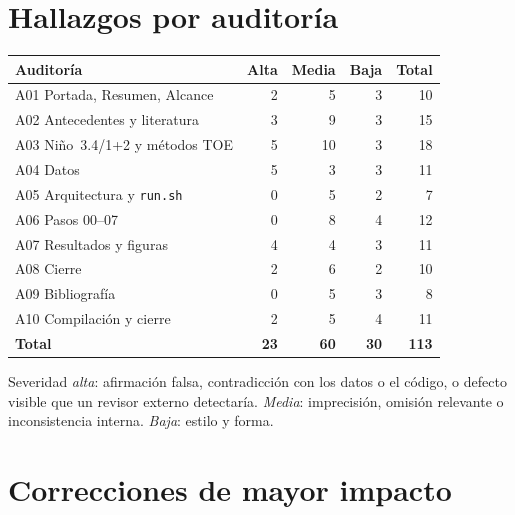 \section{Hallazgos por auditoría}

\begin{center}\small
\begin{tabular}{@{}lrrrr@{}}
\toprule
Auditoría & Alta & Media & Baja & Total \\
\midrule
A01 Portada, Resumen, Alcance & 2 & 5 & 3 & 10 \\
A02 Antecedentes y literatura & 3 & 9 & 3 & 15 \\
A03 Niño~3.4/1+2 y métodos TOE & 5 & 10 & 3 & 18 \\
A04 Datos & 5 & 3 & 3 & 11 \\
A05 Arquitectura y \texttt{run.sh} & 0 & 5 & 2 & 7 \\
A06 Pasos 00--07 & 0 & 8 & 4 & 12 \\
A07 Resultados y figuras & 4 & 4 & 3 & 11 \\
A08 Cierre & 2 & 6 & 2 & 10 \\
A09 Bibliografía & 0 & 5 & 3 & 8 \\
A10 Compilación y cierre & 2 & 5 & 4 & 11 \\
\midrule
\textbf{Total} & \textbf{23} & \textbf{60} & \textbf{30} & \textbf{113} \\
\bottomrule
\end{tabular}
\end{center}

Severidad \emph{alta}: afirmación falsa, contradicción con los datos o el código, o defecto visible que un revisor externo detectaría. \emph{Media}: imprecisión, omisión relevante o inconsistencia interna. \emph{Baja}: estilo y forma.

\section{Correcciones de mayor impacto}

